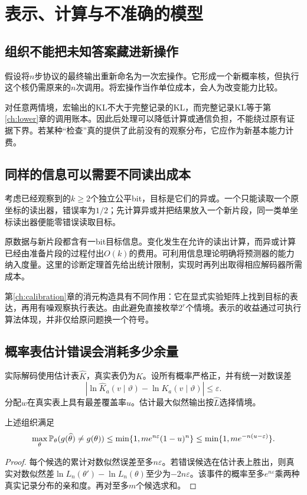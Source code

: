 \chapter{表示、计算与不准确的模型}
\label{ch:representation}

\section{组织不能把未知答案藏进新操作}
假设将$n$步协议的最终输出重新命名为一次宏操作。它形成一个新概率核，但执行这个核仍需原来的$n$次调用。将宏操作当作单位成本，会人为改变能力比较。

对任意两情境，宏输出的KL不大于完整记录的KL，而完整记录KL等于第\ref{ch:lower}章的调用账本。因此后处理可以降低计算或通信负担，不能绕过原有证据下界。若某种“检查”真的提供了此前没有的观察分布，它应作为新基本能力计费。

\section{同样的信息可以需要不同读出成本}
考虑已经观察到的$k\ge2$个独立公平bit，目标是它们的异或。一个只能读取一个原坐标的读出器，错误率为$1/2$；先计算异或并把结果放入一个新片段，同一类单坐标读出器便能零错误读取目标。

原数据与新片段都含有一bit目标信息。变化发生在允许的读出计算，而异或计算已经由准备片段的过程付出$O(k)$的费用。可利用信息理论明确将预测器的能力纳入度量\citep{xu2020}。这里的诊断定理首先给出统计限制，实现时再列出取得相应解码器所需成本。

第\ref{ch:calibration}章的消元构造具有不同作用：它在显式实验矩阵上找到目标的表达，再用有噪观察执行表达。由此避免直接枚举$2^r$个情境。表示的收益通过可执行算法体现，并非仅给原问题换一个符号。

\section{概率表估计错误会消耗多少余量}
实际解码使用估计表$\widehat K$，真实表仍为$K$。设所有概率严格正，并有统一对数误差
\[
 |\ln\widehat K_a(v\mid\vartheta)-\ln K_a(v\mid\vartheta)|\le\varepsilon.
\]
分配$w$在真实表上具有最差覆盖率$u$。估计最大似然输出按$\widehat L$选择情境。

\begin{theorem}[模型误差的可靠性代价]
\label{thm:robust}
上述组织满足
\[
 \max_\theta\mathbb P_\theta(g(\widehat\theta)\ne g(\theta))
 \le\min\{1,me^{n\varepsilon}(1-u)^n\}
 \le\min\{1,me^{-n(u-\varepsilon)}\}.
\]
\end{theorem}
\begin{proof}
每个候选的累计对数似然误差至多$n\varepsilon$。若错误候选在估计表上胜出，则真实对数似然差$\ln L_n(\theta')-\ln L_n(\theta)$至少为$-2n\varepsilon$。该事件的概率至多$e^{n\varepsilon}$乘两种真实记录分布的亲和度。再对至多$m$个候选求和。
\end{proof}


